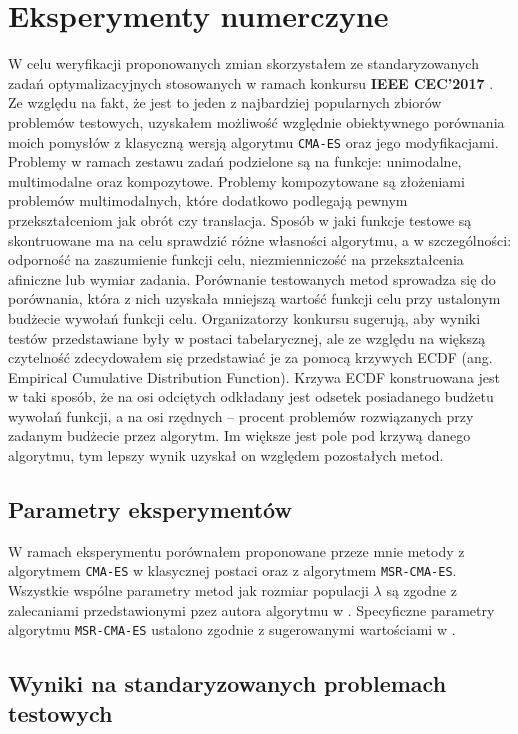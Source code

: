 \section{Eksperymenty numerczyne}
\label{section:eksperymenty}
  W celu weryfikacji proponowanych zmian skorzystałem ze standaryzowanych zadań optymalizacyjnych stosowanych w ramach konkursu
  \textbf{IEEE CEC'2017} \cite{cec2017}. Ze względu na fakt, że jest to jeden z najbardziej popularnych zbiorów problemów testowych, uzyskałem
  możliwość względnie obiektywnego porównania moich pomysłów z klasyczną wersją algorytmu \texttt{CMA-ES} oraz jego modyfikacjami.
  Problemy w ramach zestawu zadań podzielone są na funkcje: unimodalne, multimodalne oraz kompozytowe. Problemy kompozytowane są
  złożeniami problemów multimodalnych, które dodatkowo podlegają pewnym przekształceniom jak obrót czy translacja.
  Sposób w jaki funkcje testowe są skontruowane ma na celu sprawdzić różne własności algorytmu, a w szczególności: odporność na zaszumienie funkcji celu,
  niezmienniczość na przekształcenia afiniczne lub wymiar zadania.
  Porównanie testowanych metod sprowadza się do porównania, która z nich uzyskała mniejszą wartość funkcji celu przy ustalonym budżecie wywołań funkcji celu.
  Organizatorzy konkursu sugerują, aby wyniki testów przedstawiane były w postaci tabelarycznej, ale ze względu na większą czytelność zdecydowałem się przedstawiać je za pomocą krzywych ECDF (ang. Empirical Cumulative Distribution Function). Krzywa ECDF konstruowana jest w taki sposób, że na osi odciętych odkładany jest odsetek posiadanego budżetu wywołań funkcji, a na osi rzędnych -- procent problemów rozwiązanych przy zadanym budżecie przez algorytm. Im większe jest pole pod krzywą danego algorytmu, tym lepszy wynik uzyskał on względem pozostałych metod.
  

\subsection{Parametry eksperymentów}
  W ramach eksperymentu porównałem proponowane przeze mnie metody z algorytmem \texttt{CMA-ES} w klasycznej postaci oraz z algorytmem \texttt{MSR-CMA-ES}.
  Wszystkie wspólne parametry metod jak rozmiar populacji $\lambda$ są zgodne z zalecaniami przedstawionymi pzez autora algorytmu w \cite{CMADEhansen}.
  Specyficzne parametry algorytmu \texttt{MSR-CMA-ES} ustalono zgodnie z sugerowanymi wartościami w \cite{Elhara13}. 

\subsection{Wyniki na standaryzowanych problemach testowych}

